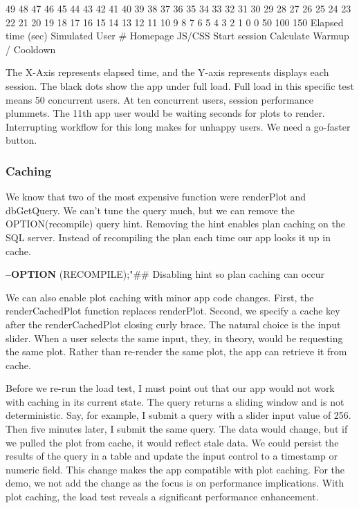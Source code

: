 \documentclass[]{article}
\newenvironment{Shaded}{\begin{snugshade}}{\end{snugshade}}
\newcommand{\ErrorTok}[1]{\textcolor[rgb]{0.64,0.00,0.00}{\textbf{#1}}}
\newcommand{\KeywordTok}[1]{\textcolor[rgb]{0.13,0.29,0.53}{\textbf{#1}}}
\newcommand{\NormalTok}[1]{#1}
\newcommand{\OperatorTok}[1]{\textcolor[rgb]{0.81,0.36,0.00}{\textbf{#1}}}
\newcommand{\StringTok}[1]{\textcolor[rgb]{0.31,0.60,0.02}{#1}}
\begin{document}
49 48 47 46 45 44 43 42 41 40 39 38 37 36 35 34 33 32 31 30 29 28 27 26
25 24 23 22 21 20 19 18 17 16 15 14 13 12 11 10 9 8 7 6 5 4 3 2 1 0 0 50
100 150 Elapsed time (sec) Simulated User \# Homepage JS/CSS Start
session Calculate Warmup / Cooldown

The X-Axis represents elapsed time, and the Y-axis represents displays
each session. The black dots show the app under full load. Full load in
this specific test means 50 concurrent users. At ten concurrent users,
session performance plummets. The 11th app user would be waiting seconds
for plots to render. Interrupting workflow for this long makes for
unhappy users. We need a go-faster button.

\hypertarget{caching}{%
\subsubsection{Caching}\label{caching}}

We know that two of the most expensive function were renderPlot and
dbGetQuery. We can't tune the query much, but we can remove the
OPTION(recompile) query hint. Removing the hint enables plan caching on
the SQL server. Instead of recompiling the plan each time our app looks
it up in cache.

\begin{Shaded}
\begin{Highlighting}[]
\OperatorTok{--}\KeywordTok{OPTION}\NormalTok{ (RECOMPILE);}\StringTok{"## Disabling hint so plan caching can occur}
\end{Highlighting}
\end{Shaded}

We can also enable plot caching with minor app code changes. First, the
renderCachedPlot function replaces renderPlot. Second, we specify a
cache key after the renderCachedPlot closing curly brace. The natural
choice is the input slider. When a user selects the same input, they, in
theory, would be requesting the same plot. Rather than re-render the
same plot, the app can retrieve it from cache.

\begin{Shaded}
\end{Shaded}

Before we re-run the load test, I must point out that our app would not
work with caching in its current state. The query returns a sliding
window and is not deterministic. Say, for example, I submit a query with
a slider input value of 256. Then five minutes later, I submit the same
query. The data would change, but if we pulled the plot from cache, it
would reflect stale data. We could persist the results of the query in a
table and update the input control to a timestamp or numeric field. This
change makes the app compatible with plot caching. For the demo, we not
add the change as the focus is on performance implications. With plot
caching, the load test reveals a significant performance enhancement.
\end{document}
